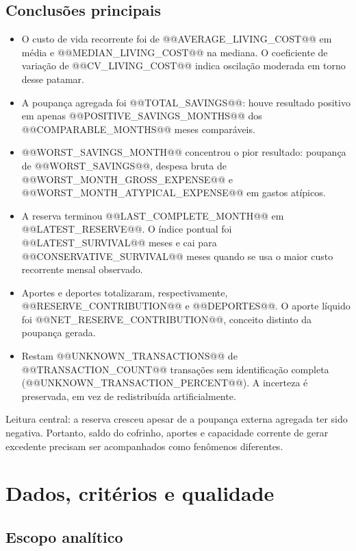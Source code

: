 \documentclass[11pt,a4paper]{article}
\newcommand{\Callout}[1]{%
  \colorbox{PaleOrange}{%
    \begin{minipage}{0.925\textwidth}
      \vspace{2mm}\small #1\vspace{2mm}
    \end{minipage}%
  }\par%
}
\begin{document}
\subsection{Conclusões principais}

\begin{itemize}
  \item O custo de vida recorrente foi de @@AVERAGE_LIVING_COST@@ em média e @@MEDIAN_LIVING_COST@@ na mediana. O coeficiente de variação de @@CV_LIVING_COST@@ indica oscilação moderada em torno desse patamar.
  \item A poupança agregada foi @@TOTAL_SAVINGS@@: houve resultado positivo em apenas @@POSITIVE_SAVINGS_MONTHS@@ dos @@COMPARABLE_MONTHS@@ meses comparáveis.
  \item @@WORST_SAVINGS_MONTH@@ concentrou o pior resultado: poupança de @@WORST_SAVINGS@@, despesa bruta de @@WORST_MONTH_GROSS_EXPENSE@@ e @@WORST_MONTH_ATYPICAL_EXPENSE@@ em gastos atípicos.
  \item A reserva terminou @@LAST_COMPLETE_MONTH@@ em @@LATEST_RESERVE@@. O índice pontual foi @@LATEST_SURVIVAL@@ meses e cai para @@CONSERVATIVE_SURVIVAL@@ meses quando se usa o maior custo recorrente mensal observado.
  \item Aportes e deportes totalizaram, respectivamente, @@RESERVE_CONTRIBUTION@@ e @@DEPORTES@@. O aporte líquido foi @@NET_RESERVE_CONTRIBUTION@@, conceito distinto da poupança gerada.
  \item Restam @@UNKNOWN_TRANSACTIONS@@ de @@TRANSACTION_COUNT@@ transações sem identificação completa (@@UNKNOWN_TRANSACTION_PERCENT@@). A incerteza é preservada, em vez de redistribuída artificialmente.
\end{itemize}

\Callout{Leitura central: a reserva cresceu apesar de a poupança externa agregada ter sido negativa. Portanto, saldo do cofrinho, aportes e capacidade corrente de gerar excedente precisam ser acompanhados como fenômenos diferentes.}

\clearpage
\section{Dados, critérios e qualidade}

\subsection{Escopo analítico}
\end{document}
